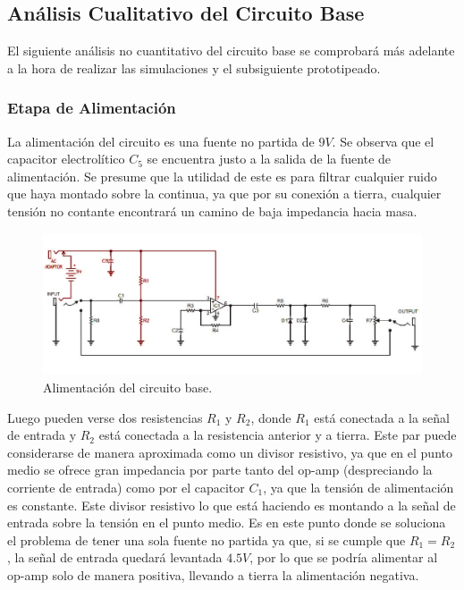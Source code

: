 


\subsection{Análisis Cualitativo del Circuito Base}

El siguiente análisis no cuantitativo del circuito base se comprobará más adelante a la hora de realizar las simulaciones y el subsiguiente prototipeado.

\subsubsection{Etapa de Alimentación}

La alimentación del circuito es una fuente no partida de $9V$. Se observa que el capacitor electrolítico $C_5$ se encuentra justo a la salida de la fuente de alimentación. Se presume que la utilidad de este es para filtrar cualquier ruido que haya montado sobre la continua, ya que por su conexión a tierra, cualquier tensión no contante encontrará un camino de baja impedancia hacia masa.

\begin{figure}[H]
	\centering
	\includegraphics[width=1\textwidth, trim={0 0 0 0}, clip]{Ejercicio5/Imagenes/circuito_base_alimentacion.png}
	\caption{Alimentación del circuito base.}
	\label{fig:circuito_base_alimentacion}
\end{figure}

Luego pueden verse dos resistencias $R_1$ y $R_2$, donde $R_1$ está conectada a la señal de entrada y $R_2$ está conectada a la resistencia anterior y a tierra. Este par puede considerarse de manera aproximada como un divisor resistivo, ya que en el punto medio se ofrece gran impedancia por parte tanto del op-amp (despreciando la corriente de entrada) como por el capacitor $C_1$, ya que la tensión de alimentación es constante.
Este divisor resistivo lo que está haciendo es montando a la señal de entrada sobre la tensión en el punto medio. Es en este punto donde se soluciona el problema de tener una sola fuente no partida ya que, si se cumple que $R_1=R_2$, la señal de entrada quedará levantada $4.5V$, por lo que se podría alimentar al op-amp solo de manera positiva, llevando a tierra la alimentación negativa.\\

